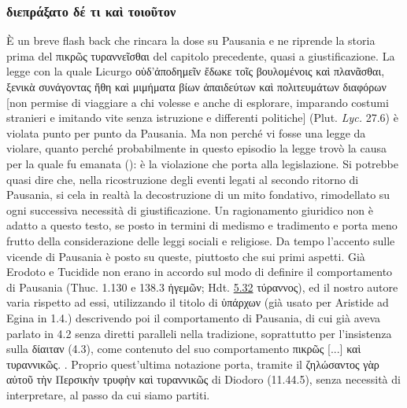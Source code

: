 {            \subsubsection{\textgreek{διεπράξατο δέ τι καὶ τοιοῦτον}}
            È un breve flash back che rincara la dose su Pausania  e ne riprende la storia prima del \textgreek{πικρῶς τυραννεῖσθαι} del capitolo precedente, quasi a giustificazione. La legge con la quale Licurgo   \textgreek{οὑδ'ἀποδημεῖν ἔδωκε τοῖς βουλομένοις καὶ πλανᾶσθαι, ξενικὰ συνάγοντας ἤθη καὶ μιμήματα βίων ἀπαιδεύτων καὶ πολιτευμάτων διαφόρων} [non permise di viaggiare a chi volesse e anche di esplorare, imparando costumi stranieri e imitando vite senza istruzione e differenti politiche] (Plut. \emph{Lyc.} 27.6)  è violata punto per punto da Pausania. Ma non perché vi fosse una legge da violare, quanto perché probabilmente in questo episodio la legge trovò la causa per la quale fu emanata (\cite[203]{Flower2002}): è la violazione che porta alla legislazione. Si potrebbe quasi dire che, nella ricostruzione degli eventi legati al secondo ritorno di Pausania, si cela in realtà la decostruzione di un mito fondativo, rimodellato su ogni successiva necessità di giustificazione. Un ragionamento giuridico non è adatto a questo testo, se posto in termini di medismo e tradimento e porta meno frutto della considerazione delle leggi sociali e religiose. Da tempo l'accento sulle vicende di Pausania  è posto su queste, piuttosto che sui primi aspetti. Già Erodoto e Tucidide non erano in accordo sul modo di definire il comportamento di Pausania  (Thuc. 1.130 e 138.3 \textgreek{ἡγεμῶν}; Hdt. \href{http://data.perseus.org/citations/urn:cts:greekLit:tlg0016.tlg001.perseus-grc1:5.32}{5.32} \textgreek{τύραννος}), ed il nostro autore varia rispetto ad essi, utilizzando il titolo di \textgreek{ὑπάρχων} (già usato per Aristide ad Egina in 1.4.) descrivendo poi il comportamento di Pausania, di cui già aveva parlato in 4.2 senza diretti paralleli nella tradizione, soprattutto per l'insistenza sulla  \textgreek{δίαιταν} (4.3), come contenuto del suo comportamento \textgreek{πικρῶς [...] καὶ τυραννικῶς}. \cite[153]{Nafissi2004}. Proprio quest'ultima notazione porta, tramite il \textgreek{ζηλώσαντος γὰρ αὐτοῦ τὴν Περσικὴν τρυφὴν καὶ τυραννικῶς} di  Diodoro (11.44.5), senza necessità di interpretare, al passo da cui siamo partiti. 
}
